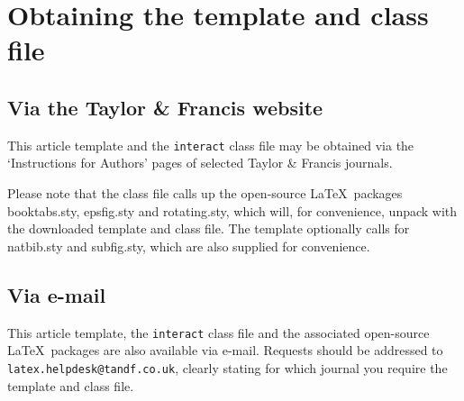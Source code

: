 \documentclass[]{interact}
\theoremstyle{plain}%
\theoremstyle{definition}
\theoremstyle{remark}
\begin{document}
\section{Obtaining the template and class file}

\subsection{Via the Taylor \& Francis website}

This article template and the \texttt{interact} class file may be obtained via the `Instructions for Authors' pages of selected Taylor \& Francis journals.

Please note that the class file calls up the open-source \LaTeX\ packages booktabs.sty, epsfig.sty and rotating.sty, which will, for convenience, unpack with the downloaded template and class file. The template optionally calls for natbib.sty and subfig.sty, which are also supplied for convenience.


\subsection{Via e-mail}

This article template, the \texttt{interact} class file and the associated open-source \LaTeX\ packages are also available via e-mail. Requests should be addressed to \texttt{latex.helpdesk@tandf.co.uk}, clearly stating for which journal you require the template and class file.
\end{document}

